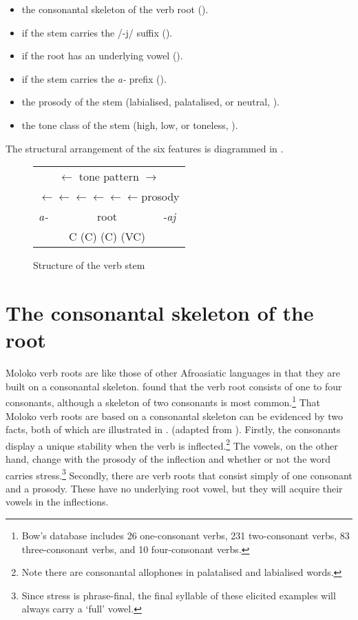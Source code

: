 \begin{itemize}
\item the consonantal skeleton of the verb root ().
\item if the stem carries the /-j/ suffix ().  
\item if the root has an underlying vowel (). 
\item if the stem carries the \textit{a-} prefix ().  
\item the prosody of the stem (labialised, palatalised, or neutral, ). 
\item the tone class of the stem (high, low, or toneless, ). 
\end{itemize}

The structural arrangement of the six features is diagrammed in . 

\begin{figure}
\begin{tabular}{l|c|l}

\multicolumn{3}{c}{$\leftarrow$ \hfill   tone pattern \hfill  $\rightarrow$}\\
\multicolumn{3}{c}{$\leftarrow\leftarrow\leftarrow\leftarrow\leftarrow\leftarrow$\hfill prosody}\\
\cline{2-2}
\itshape a- & root & \itshape -aj\\
            & C (C) (C) (VC) &   \\\cline{2-2}
\end{tabular}
\caption{Structure of the verb stem}\label{fig:10}
\end{figure}

\section{The consonantal skeleton of the root}\label{sec:6.2}
\hypertarget{RefHeading1211921525720847}{}
Moloko verb roots are like those of other Afroasiatic languages in that they are built on a consonantal skeleton. \citet{Bow1997c} found that the verb root consists of one to four consonants, although a skeleton of two consonants is most common.\footnote{Bow’s database includes 26 one-consonant verbs, 231 two-consonant verbs, 83 three-consonant verbs, and 10 four-consonant verbs. } That Moloko verb roots are based on a consonantal skeleton can be evidenced by two facts, both of which are illustrated in . (adapted from \citealt{Bow1997c}). Firstly, the consonants display a unique stability when the verb is inflected.\footnote{Note there are consonantal allophones in palatalised and labialised words. } The vowels, on the other hand, change with the prosody of the inflection and whether or not the word carries stress.\footnote{Since stress is phrase-final, the final syllable of these elicited examples will always carry a ‘full’ vowel.} Secondly, there are verb roots that consist simply of one consonant and a prosody. These have no underlying root vowel, but they will acquire their vowels in the inflections. 

